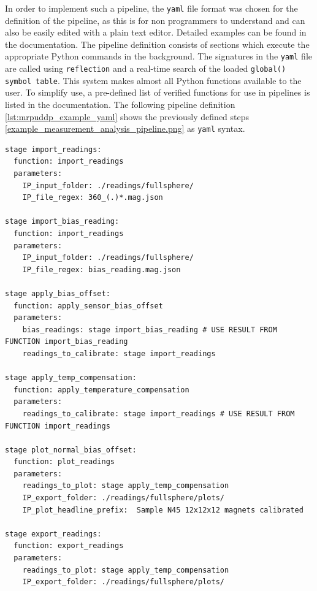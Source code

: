 In order to implement such a pipeline, the
\passthrough{\lstinline!yaml!} file format was chosen for the definition
of the pipeline, as this is for non programmers to understand and can
also be easily edited with a plain text editor. Detailed examples can be
found in the
documentation\cite{MagneticReadoutProcessingReadTheDocs}. The
pipeline definition consists of sections which execute the appropriate
Python commands in the background. The signatures in the
\passthrough{\lstinline!yaml!} file are called using
\passthrough{\lstinline!reflection!} and a real-time search of the
loaded
\passthrough{\lstinline!global() symbol table!}\cite{PythonGlobalSymbolTable}.
This system makes almost all Python functions available to the user. To
simplify use, a pre-defined list of verified functions for use in
pipelines is listed in the
documentation\cite{MagneticReadoutProcessingReadTheDocs}. The
following pipeline definition \ref{lst:mrpuddp_example_yaml} shows the
previously defined steps \ref{example_measurement_analysis_pipeline.png}
as \passthrough{\lstinline!yaml!} syntax.

\begin{lstlisting}[caption={Example YAML code of an user defined processing pipeline with six stages linked together}, label=lst:mrpuddp_example_yaml]
stage import_readings:
  function: import_readings
  parameters:
    IP_input_folder: ./readings/fullsphere/
    IP_file_regex: 360_(.)*.mag.json

stage import_bias_reading:
  function: import_readings
  parameters:
    IP_input_folder: ./readings/fullsphere/
    IP_file_regex: bias_reading.mag.json

stage apply_bias_offset:
  function: apply_sensor_bias_offset
  parameters:
    bias_readings: stage import_bias_reading # USE RESULT FROM FUNCTION import_bias_reading
    readings_to_calibrate: stage import_readings

stage apply_temp_compensation:
  function: apply_temperature_compensation
  parameters:
    readings_to_calibrate: stage import_readings # USE RESULT FROM FUNCTION import_readings

stage plot_normal_bias_offset:
  function: plot_readings
  parameters:
    readings_to_plot: stage apply_temp_compensation
    IP_export_folder: ./readings/fullsphere/plots/
    IP_plot_headline_prefix:  Sample N45 12x12x12 magnets calibrated

stage export_readings:
  function: export_readings
  parameters:
    readings_to_plot: stage apply_temp_compensation
    IP_export_folder: ./readings/fullsphere/plots/
\end{lstlisting}

